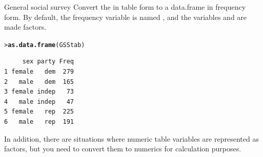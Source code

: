 \documentclass[10pt,krantz2]{krantz}\usepackage[]{graphicx}\usepackage[]{color}
\makeatletter
\newcommand{\hlstd}[1]{\textcolor[rgb]{0.345,0.345,0.345}{#1}}%
\newcommand{\hlkwd}[1]{\textcolor[rgb]{0.737,0.353,0.396}{\textbf{#1}}}%
\newenvironment{kframe}{%
 \def\at@end@of@kframe{}%
 \ifinner\ifhmode%
  \def\at@end@of@kframe{\end{minipage}}%
  \begin{minipage}{\columnwidth}%
 \fi\fi%
 \def\FrameCommand##1{\hskip\@totalleftmargin \hskip-\fboxsep
 \colorbox{shadecolor}{##1}\hskip-\fboxsep
     \hskip-\linewidth \hskip-\@totalleftmargin \hskip\columnwidth}%
 \MakeFramed {\advance\hsize-\width
   \@totalleftmargin\z@ \linewidth\hsize
   \@setminipage}}%
 {\par\unskip\endMakeFramed%
 \at@end@of@kframe}
\newenvironment{knitrout}{}{} %
\renewenvironment{knitrout}{\small\renewcommand{\baselinestretch}{.85}}{} %
\makeatother
\begin{document}
\begin{Example}{General social survey}
Convert the  in table form to a data.frame in frequency form.
By default, the frequency variable is named , and the variables
 and  are made factors.
\begin{knitrout}
\color{fgcolor}\begin{kframe}
\begin{alltt}
\hlstd{> }\hlkwd{as.data.frame}\hlstd{(GSStab)}
\end{alltt}
\begin{verbatim}
     sex party Freq
1 female   dem  279
2   male   dem  165
3 female indep   73
4   male indep   47
5 female   rep  225
6   male   rep  191
\end{verbatim}
\end{kframe}
\end{knitrout}
\end{Example}

In addition, there are situations where numeric table variables are represented as
factors, but you need to
convert them to numerics for calculation purposes.
\end{document}
